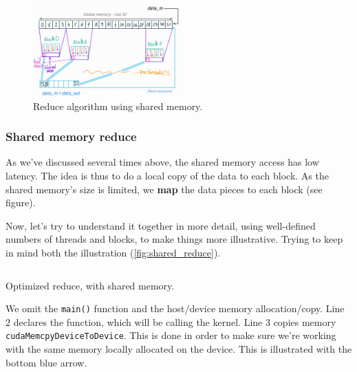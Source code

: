 \documentclass[12pt]{article}
\begin{document}
\begin{figure}
   \vspace{-0.9cm}
   \begin{center}
   \includegraphics[width=0.5\textwidth]{pngs/shared_reduce.jpg}
   \end{center}
   \vspace{-0.5cm}
   \captionsetup{justification=raggedleft}
   \caption{Reduce algorithm using shared memory.}
   \label{fig:shared_reduce}
\end{figure}





\subsubsection*{Shared memory reduce}
As we've discussed several times above, the shared memory access has low latency. The idea is thus 
to do a local copy of the data to each block. As the shared memory's size is limited, we \textbf{map} the 
data pieces to each block (see figure).

Now, let's try to understand it together in more detail, using well-defined numbers of threads and blocks, 
to make things more illustrative. Trying to keep in mind both the illustration (\autoref{fig:shared_reduce}).

\begin{listing}
\inputminted[frame=single, framesep=1mm, linenos=true]{cuda}{cucodes/shared_rreduced.cu}
\caption{Optimized reduce, with shared memory. \cite{tuomanen2018hands}}
\end{listing}

We omit the \verb|main()| function and the host/device memory allocation/copy.
Line $2$ declares the function, which will be calling the kernel. Line $3$ copies memory 
\verb|cudaMemcpyDeviceToDevice|. This is done in order to make sure we're working with the same memory locally allocated on the device.
This is illustrated with the bottom blue arrow. 
\end{document}
